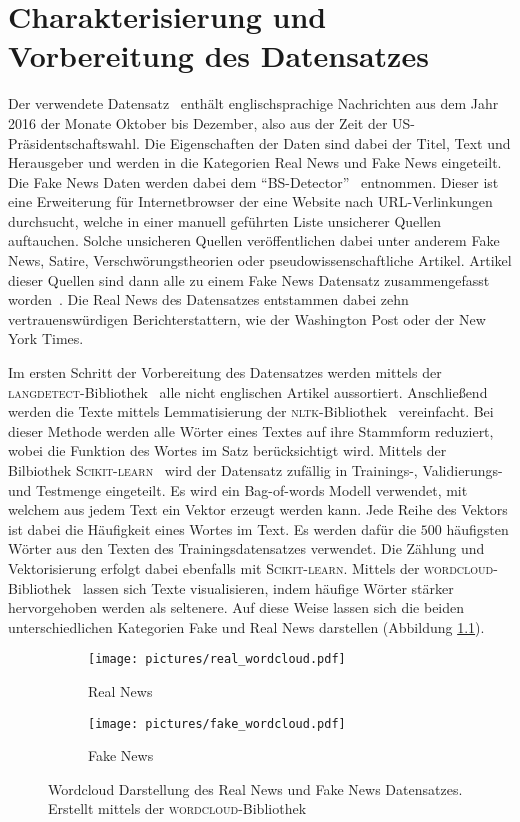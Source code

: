 \chapter{Charakterisierung und Vorbereitung des Datensatzes}
Der verwendete Datensatz~\cite{real_data} enthält englischsprachige Nachrichten aus dem Jahr 
2016 der Monate Oktober bis Dezember, also aus der Zeit der US-Präsidentschaftswahl.
Die Eigenschaften der Daten sind dabei der Titel, Text und Herausgeber und werden in die Kategorien 
Real News und Fake News eingeteilt. Die Fake News Daten werden dabei dem 
\enquote{BS-Detector}~\cite{BS} entnommen. Dieser ist eine Erweiterung für Internetbrowser 
der eine Website nach URL-Verlinkungen durchsucht, welche in einer manuell geführten 
Liste unsicherer Quellen auftauchen. Solche unsicheren Quellen veröffentlichen dabei unter anderem 
Fake News, Satire, Verschwörungstheorien oder pseudowissenschaftliche Artikel. Artikel dieser Quellen 
sind dann alle zu einem Fake News Datensatz zusammengefasst worden~\cite{fake_data}. Die 
Real News des Datensatzes entstammen dabei zehn vertrauenswürdigen Berichterstattern, wie der 
Washington Post oder der New York Times. 

Im ersten Schritt der Vorbereitung des Datensatzes werden mittels der \textsc{langdetect}-Bibliothek~\cite{google_langdetect}
alle nicht englischen Artikel aussortiert. Anschließend werden die Texte mittels Lemmatisierung
der \textsc{nltk}-Bibliothek~\cite{nltk} vereinfacht. Bei dieser Methode werden alle Wörter eines Textes auf ihre Stammform reduziert,
wobei die Funktion des Wortes im Satz berücksichtigt wird. Mittels der Bilbiothek \textsc{Scikit-learn}~\cite{scikit-learn}
wird der Datensatz zufällig in Trainings-, Validierungs- und Testmenge eingeteilt. Es wird ein 
Bag-of-words Modell verwendet, mit welchem aus jedem Text ein Vektor erzeugt werden kann. Jede Reihe 
des Vektors ist dabei die Häufigkeit eines Wortes im Text. Es werden dafür die $500$ häufigsten Wörter 
aus den Texten des Trainingsdatensatzes verwendet. Die Zählung und Vektorisierung erfolgt dabei
ebenfalls mit \textsc{Scikit-learn}. Mittels der \textsc{wordcloud}-Bibliothek~\cite{wordcloud}
lassen sich Texte visualisieren, indem häufige Wörter stärker hervorgehoben werden als seltenere.
Auf diese Weise lassen sich die beiden unterschiedlichen Kategorien Fake und Real News darstellen
(Abbildung \ref{fig:WordcloudData}).

\begin{figure}
    \centering
    \begin{subfigure}{0.8\textwidth}
        \centering
        \texttt{[image: pictures/real\_wordcloud.pdf]}
        \caption{Real News}
    \end{subfigure}
    \begin{subfigure}{0.8\textwidth}
        \centering
        \texttt{[image: pictures/fake\_wordcloud.pdf]}
        \caption{Fake News}
    \end{subfigure}
    \caption{Wordcloud Darstellung des Real News und Fake News 
    Datensatzes. Erstellt mittels der \textsc{wordcloud}-Bibliothek~\cite{wordcloud} }
    \label{fig:WordcloudData}
\end{figure}

